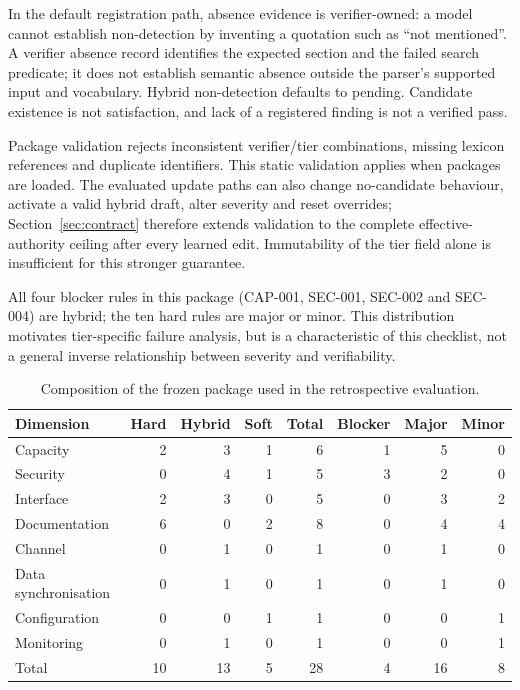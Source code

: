 \documentclass[computers,article,submit,moreauthors]{Definitions/mdpi}
\begin{document}
In the default registration path, absence evidence is verifier-owned: a model cannot establish non-detection by inventing a quotation such as ``not mentioned''. A verifier absence record identifies the expected section and the failed search predicate; it does not establish semantic absence outside the parser's supported input and vocabulary. Hybrid non-detection defaults to pending. Candidate existence is not satisfaction, and lack of a registered finding is not a verified pass.

Package validation rejects inconsistent verifier/tier combinations, missing lexicon references and duplicate identifiers. This static validation applies when packages are loaded. The evaluated update paths can also change no-candidate behaviour, activate a valid hybrid draft, alter severity and reset overrides; Section~\ref{sec:contract} therefore extends validation to the complete effective-authority ceiling after every learned edit. Immutability of the tier field alone is insufficient for this stronger guarantee.

All four blocker rules in this package (CAP-001, SEC-001, SEC-002 and SEC-004) are hybrid; the ten hard rules are major or minor. This distribution motivates tier-specific failure analysis, but is a characteristic of this checklist, not a general inverse relationship between severity and verifiability.

\begin{table}[!ht]
\caption{Composition of the frozen package used in the retrospective evaluation.}
\label{tab:composition}
\centering\footnotesize
\begin{tabular}{@{}lrrr rrrr@{}}
\toprule
Dimension & Hard & Hybrid & Soft & Total & Blocker & Major & Minor \\
\midrule
Capacity & 2 & 3 & 1 & 6 & 1 & 5 & 0 \\
Security & 0 & 4 & 1 & 5 & 3 & 2 & 0 \\
Interface & 2 & 3 & 0 & 5 & 0 & 3 & 2 \\
Documentation & 6 & 0 & 2 & 8 & 0 & 4 & 4 \\
Channel & 0 & 1 & 0 & 1 & 0 & 1 & 0 \\
Data synchronisation & 0 & 1 & 0 & 1 & 0 & 1 & 0 \\
Configuration & 0 & 0 & 1 & 1 & 0 & 0 & 1 \\
Monitoring & 0 & 1 & 0 & 1 & 0 & 0 & 1 \\
\midrule
Total & 10 & 13 & 5 & 28 & 4 & 16 & 8 \\
\bottomrule
\end{tabular}
\end{table}
\end{document}
